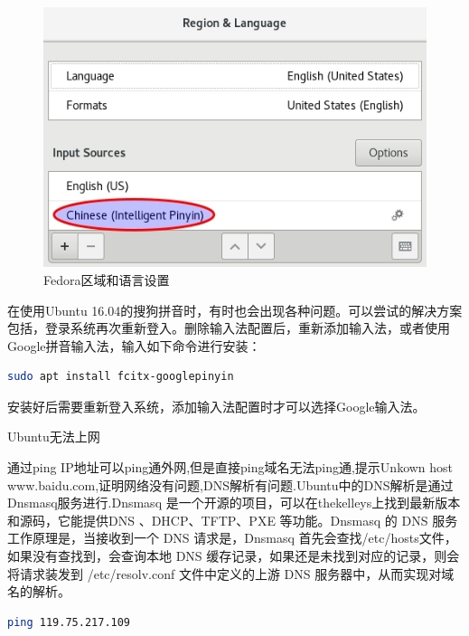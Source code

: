 \documentclass[12pt]{book}
\makeatletter
\numberwithin{dummy}{section}
\theoremstyle{ocrenumbox}
\theoremstyle{blacknumex}
\theoremstyle{blacknumbox}
\theoremstyle{ocrenum}
\renewcommand{\subsection}{\@startsection {subsection}{2}{\z@}
	{-3ex \@plus -0.1ex \@minus -.4ex}
	{0.5ex \@plus.2ex }
	{\normalfont\sffamily\bfseries}}
\makeatother
\begin{document}
\begin{figure}[htbp]
	\centering
	\includegraphics[scale=0.6]{regionandlanguagesetting.jpg}
	\caption{Fedora区域和语言设置}
	\label{fig:regionandlanguagesetting}
\end{figure}

在使用Ubuntu 16.04的搜狗拼音时，有时也会出现各种问题。可以尝试的解决方案包括，登录系统再次重新登入。删除输入法配置后，重新添加输入法，或者使用Google拼音输入法，输入如下命令进行安装：

\begin{lstlisting}[language=Bash]
sudo apt install fcitx-googlepinyin
\end{lstlisting}

安装好后需要重新登入系统，添加输入法配置时才可以选择Google输入法。

\subsection{Ubuntu无法上网}

通过ping IP地址可以ping通外网,但是直接ping域名无法ping通,提示Unkown host www.baidu.com,证明网络没有问题,DNS解析有问题.Ubuntu中的DNS解析是通过Dnsmasq服务进行.Dnsmasq 是一个开源的项目，可以在thekelleys上找到最新版本和源码，它能提供DNS 、DHCP、TFTP、PXE 等功能。Dnsmasq 的 DNS 服务工作原理是，当接收到一个 DNS 请求是，Dnsmasq 首先会查找/etc/hosts文件，如果没有查找到，会查询本地 DNS 缓存记录，如果还是未找到对应的记录，则会将请求装发到 /etc/resolv.conf 文件中定义的上游 DNS 服务器中，从而实现对域名的解析。

\begin{lstlisting}[language=Bash]
ping 119.75.217.109
\end{lstlisting}
\end{document}
